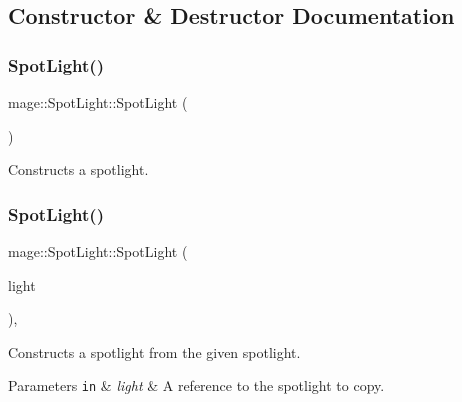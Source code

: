 \subsection{Constructor \& Destructor Documentation}
\hypertarget{classmage_1_1_spot_light_ae82577a45cf84c375a58b1789a05ce0d}{}\label{classmage_1_1_spot_light_ae82577a45cf84c375a58b1789a05ce0d} 
\subsubsection{\texorpdfstring{Spot\+Light()}{SpotLight()}\hspace{0.1cm}{\footnotesize\ttfamily [1/3]}}
{\footnotesize\ttfamily mage\+::\+Spot\+Light\+::\+Spot\+Light (\begin{DoxyParamCaption}{ }\end{DoxyParamCaption})\hspace{0.3cm}{\ttfamily [noexcept]}}

Constructs a spotlight. \hypertarget{classmage_1_1_spot_light_a93287b22630e43766fdab04e0c235a30}{}\label{classmage_1_1_spot_light_a93287b22630e43766fdab04e0c235a30} 
\subsubsection{\texorpdfstring{Spot\+Light()}{SpotLight()}\hspace{0.1cm}{\footnotesize\ttfamily [2/3]}}
{\footnotesize\ttfamily mage\+::\+Spot\+Light\+::\+Spot\+Light (\begin{DoxyParamCaption}\item[{const \hyperlink{classmage_1_1_spot_light}{Spot\+Light} \&}]{light }\end{DoxyParamCaption})\hspace{0.3cm}{\ttfamily [default]}, {\ttfamily [noexcept]}}

Constructs a spotlight from the given spotlight.


\begin{DoxyParams}[1]{Parameters}
\mbox{\tt in}  & {\em light} & A reference to the spotlight to copy. \\
\hline
\end{DoxyParams}
\hypertarget{classmage_1_1_spot_light_a694e2e49340440515438a86baa284431}{}\label{classmage_1_1_spot_light_a694e2e49340440515438a86baa284431} 
